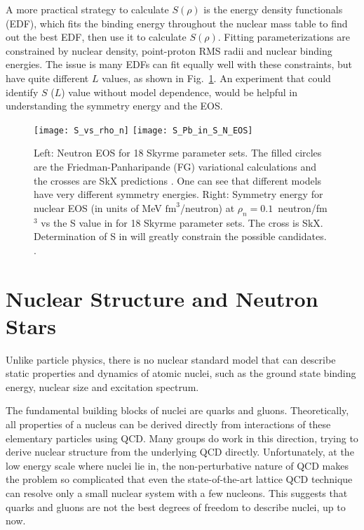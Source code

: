 A more practical strategy to calculate $S(\rho)$ is the energy density functionals (EDF), 
which fits the binding energy throughout the nuclear mass table to find out the best EDF,
then use it to calculate $S(\rho)$. Fitting parameterizations are constrained
by nuclear density, point-proton RMS radii and nuclear binding energies. 
The issue is many EDFs can fit equally well with these constraints, but have quite 
different $L$ values, as shown in Fig.~\ref{fig:neutron_EOS}.
An experiment that could identify $S$ ($L$) value without model dependence, 
would be helpful in understanding the symmetry energy and the EOS.
\begin{figure}[!h]
    \texttt{[image: S\_vs\_rho\_n]}
    \hfill
    \texttt{[image: S\_Pb\_in\_S\_N\_EOS]}
    \caption[Neutron EOS with different slope values]
    {Left: Neutron EOS for 18 Skyrme \cite{Skyrme} parameter sets. The filled circles are
    the Friedman-Panharipande (FG) variational calculations and the crosses are SkX predictions
    \cite{PhysRevC.58.220}.
    One can see that different models have very different symmetry energies.
    Right: Symmetry energy for nuclear EOS (in units of MeV $\mathrm{fm}^3$/neutron) 
    at $\rho_n = 0.1$~neutron/fm${}^3$ vs the S value in \Pb for 18 Skyrme parameter sets. 
    The cross is SkX. Determination of S in \Pb will greatly constrain the 
    possible candidates.
    \cite{PRL.85.5296}.
    }
    \label{fig:neutron_EOS}
\end{figure}

  
\section{Nuclear Structure and Neutron Stars}
Unlike particle physics, there is no nuclear standard model that can describe
static properties and dynamics of atomic nuclei, such as the ground state binding energy,
nuclear size and excitation spectrum. 

The fundamental building blocks of nuclei are quarks and gluons. Theoretically, 
all properties of a nucleus can be derived directly from interactions
of these elementary particles using QCD. Many groups do work in this direction, 
trying to derive nuclear structure from the underlying QCD directly. 
Unfortunately, at the low energy scale where nuclei lie in, the non-perturbative nature of 
QCD makes the problem so complicated that even the state-of-the-art lattice QCD
technique can resolve only a small nuclear system with a few nucleons.
This suggests that quarks and gluons are not the best degrees of freedom to describe nuclei, 
up to now.

